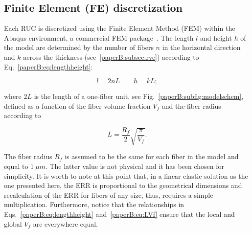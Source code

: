 %

\subsection{Finite Element (FE) discretization}

Each RUC is discretized using the Finite Element Method (FEM) within the Abaqus environment, a commercial FEM package~\cite{abq12}. The length $l$ and height $h$ of the model are determined by the number of fibers $n$ in the horizontal direction and $k$ across the thickness (see~\ref{paperB:subsec:rve}) according to Eq.~\ref{paperB:eq:lengthheight}:

\begin{equation}\label{paperB:eq:lengthheight}
l=2nL\qquad h=kL;
\end{equation}

where $2L$ is the length of a one-fiber unit, see Fig.~\ref{paperB:subfig:modelschem}, defined as a function of the fiber volume fraction $V_{f}$ and the fiber radius according to

\begin{equation}\label{paperB:eq:LVf}
L=\frac{R_{f}}{2}\sqrt{\frac{\pi}{V_{f}}}.
\end{equation}

The fiber radius $R_{f}$ is assumed to be the same for each fiber in the model and equal to $1\ \mu m$. The latter value is not physical and it has been chosen for simplicity. It is worth to note at this point that, in a linear elastic solution as the one presented here, the ERR is proportional to the geometrical dimensions and recalculation of the ERR for fibers of any size, thus, requires a simple multiplication. Furthermore, notice that the relationships in Eqs.~\ref{paperB:eq:lengthheight} and~\ref{paperB:eq:LVf} ensure that the local and global $V_{f}$ are everywhere equal.

